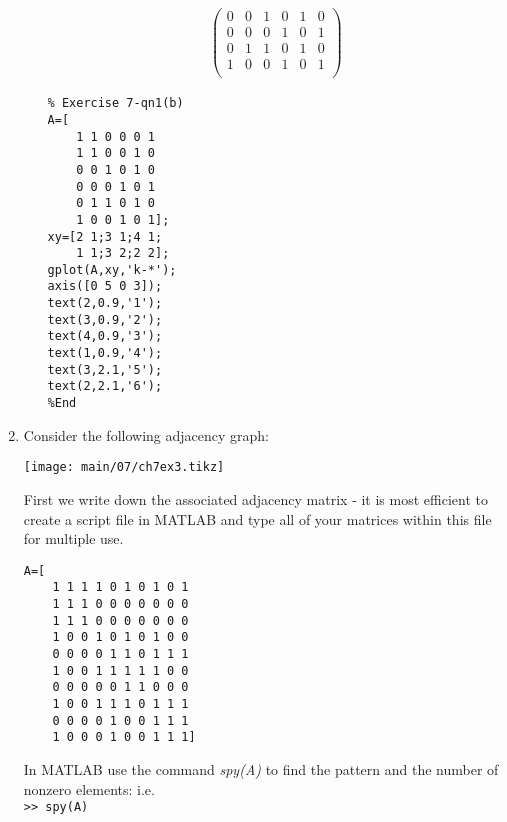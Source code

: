 \begin{enumerate}
\begin{enumerate}
\begin{minipage}[t]{0.49\linewidth}
\begin{align*}
\begin{pmatrix}
                    0 & 0 & 1 & 0 & 1 & 0\\
                    0 & 0 & 0 & 1 & 0 & 1\\
                    0 & 1 & 1 & 0 & 1 & 0\\
                    1 & 0 & 0 & 1 & 0 & 1\\
                \end{pmatrix}
            \end{align*}
            \begin{lstlisting}
% Exercise 7-qn1(b)
A=[
    1 1 0 0 0 1
    1 1 0 0 1 0
    0 0 1 0 1 0
    0 0 0 1 0 1
    0 1 1 0 1 0
    1 0 0 1 0 1];
xy=[2 1;3 1;4 1;
    1 1;3 2;2 2];
gplot(A,xy,'k-*');
axis([0 5 0 3]);
text(2,0.9,'1');
text(3,0.9,'2');
text(4,0.9,'3');
text(1,0.9,'4');
text(3,2.1,'5');
text(2,2.1,'6');
%End
            \end{lstlisting}
        \end{minipage}
        \begin{minipage}[t]{0.5\linewidth}
            
        \end{minipage}
    \end{enumerate}


\item

    Consider the following adjacency graph:
    \begin{center}
        \texttt{[image: main/07/ch7ex3.tikz]}
    \end{center}
    First we write down the associated adjacency matrix - it is most efficient
    to create a script file in MATLAB and type all of your matrices within this
    file for multiple use.

    \begin{minipage}[t]{0.49\linewidth}
        \begin{lstlisting}
A=[
    1 1 1 1 0 1 0 1 0 1
    1 1 1 0 0 0 0 0 0 0
    1 1 1 0 0 0 0 0 0 0
    1 0 0 1 0 1 0 1 0 0
    0 0 0 0 1 1 0 1 1 1
    1 0 0 1 1 1 1 1 0 0
    0 0 0 0 0 1 1 0 0 0
    1 0 0 1 1 1 0 1 1 1
    0 0 0 0 1 0 0 1 1 1
    1 0 0 0 1 0 0 1 1 1]
        \end{lstlisting}
        In MATLAB use the command \textit{spy(A)} to find the pattern and the
        number of nonzero elements: i.e.\\
        \texttt{>> spy(A)}
    \end{minipage}
    \begin{minipage}[t]{0.5\linewidth}
        
    \end{minipage}


\end{enumerate}

